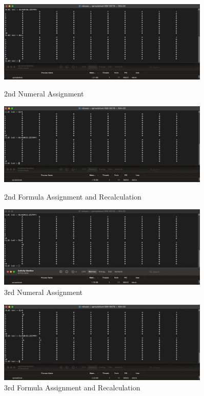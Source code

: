 \documentclass[10pt,a4paper]{article}  %
\begin{document}
\begin{figure}[h!]
    \centering
    \begin{minipage}{0.3\textwidth}
        \centering
        \includegraphics[width=0.9\textwidth]{2num.jpeg}
        \caption{2nd Numeral Assignment}
        \label{fig:2num}
    \end{minipage}\hfill
    \begin{minipage}{0.3\textwidth}
        \centering
        \includegraphics[width=0.9\textwidth]{2for.jpeg}
        \caption{2nd Formula Assignment and Recalculation}
        \label{fig:2for}
    \end{minipage}\hfill
    \begin{minipage}{0.3\textwidth}
        \centering
        \includegraphics[width=0.9\textwidth]{3num.jpeg}
        \caption{3rd Numeral Assignment}
        \label{fig:3num}
    \end{minipage}
\end{figure}
\begin{figure}[h!]
    \centering
    \begin{minipage}{0.3\textwidth}
        \centering
        \includegraphics[width=0.9\textwidth]{3for.jpeg}
        \caption{3rd Formula Assignment and Recalculation}
        \label{fig:3for}
    \end{minipage}
\end{figure}
\end{document}
